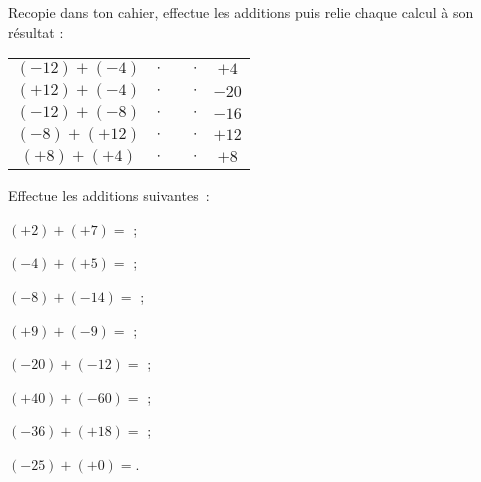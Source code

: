 

\begin{exercice}
Recopie dans ton cahier, effectue les additions puis relie chaque calcul à son résultat :
\begin{center}
 \begin{tabularx}{0.95\linewidth}{|cc|X|cc|}
  \cline{1-2}\cline{4-5}
  $(-12) + (-4)$ & $\cdot$ & & $\cdot$ & $+4$ \\ \cline{1-2}\cline{4-5}
  $(+12) + (-4)$ & $\cdot$ & & $\cdot$ & $-20$ \\ \cline{1-2}\cline{4-5}
  $(-12) + (-8)$ & $\cdot$ & & $\cdot$ & $-16$ \\ \cline{1-2}\cline{4-5}
  $(-8) + (+12)$ & $\cdot$ & & $\cdot$ & $+12$ \\ \cline{1-2}\cline{4-5}
  $(+8) + (+4)$ & $\cdot$ & & $\cdot$ & $+8$ \\ \cline{1-2}\cline{4-5}
  \end{tabularx}
  \end{center}
\end{exercice}

\begin{exercice}
Effectue les additions suivantes :
\begin{colenumerate}{2}
 \item $(+2) + (+7)=$ \dotfill;
 \vspace{.3em}
 \item $(-4) + (+5)=$ \dotfill;
 \vspace{.3em}
 \item $(-8) + (-14)=$ \dotfill;
  \vspace{.3em}
 \item $(+9) + (-9)=$ \dotfill;
  \vspace{.3em}
 \item $(-20) + (-12)=$ \dotfill;
  \vspace{.3em}
 \item $(+40) + (-60)=$ \dotfill;
  \vspace{.3em}
 \item $(-36) + (+18)=$ \dotfill;
  \vspace{.3em}
 \item $(-25) + (+0)=$\dotfill.
 \end{colenumerate}
\end{exercice}


